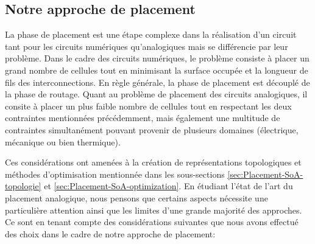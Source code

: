 \subsection{Notre approche de placement}
La phase de placement est une étape complexe dans la réalisation d'un circuit tant pour les circuits numériques qu'analogiques mais se différencie par leur problème. Dans le cadre des circuits numériques, le problème consiste à placer un grand nombre de cellules tout en minimisant la surface occupée et la longueur de fils des interconnections. En règle générale, la phase de placement est découplé de la phase de routage. Quant au problème de placement des circuits analogiques, il consite à placer un plus faible nombre de cellules tout en respectant les deux contraintes mentionnées précédemment, mais également une multitude de contraintes simultanément pouvant provenir de plusieurs domaines (électrique, mécanique ou bien thermique). \newline

Ces considérations ont amenées à la création de représentations topologiques et méthodes d'optimisation mentionnée dans les sous-sections \ref{sec:Placement-SoA-topologie} et \ref{sec:Placement-SoA-optimization}. En étudiant l'état de l'art du placement analogique, nous pensons que certains aspects nécessite une particulière attention ainsi que les limites d'une grande majorité des approches. Ce sont en tenant compte des considérations suivantes que nous avons effectué des choix dans le cadre de notre approche de placement:

